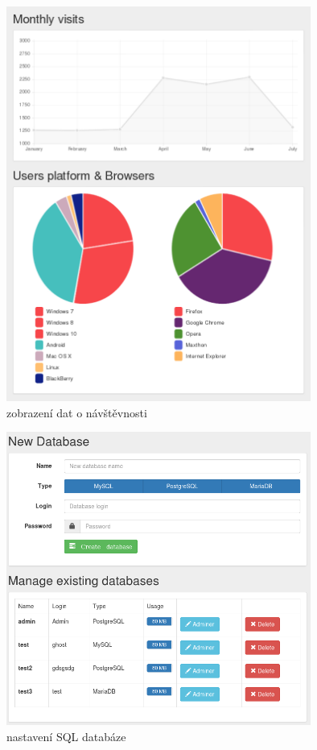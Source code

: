 \documentclass[11pt,a4paper]{article}
\begin{document}
    \begin{figure}[ht]
      \begin{center}
        \includegraphics[width=10cm]{graphs}
        \caption{zobrazení dat o návštěvnosti}
      \end{center}
    \end{figure}

    \begin{figure}[ht]
      \begin{center}
        \includegraphics[width=10cm]{sql}
        \caption{nastavení SQL databáze}
      \end{center}
    \end{figure}
\end{document}
